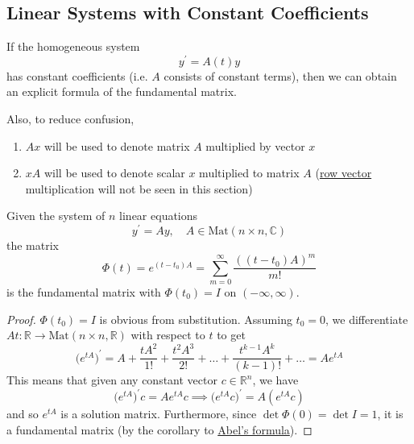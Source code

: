 \documentclass{article}
\newcounter{theorem}[section]
\begin{document}
  \subsection{Linear Systems with Constant Coefficients}

    If the homogeneous system 
    \begin{equation}
      y^\prime = A(t) y
    \end{equation}
    has constant coefficients (i.e. $A$ consists of constant terms), then we can obtain an explicit formula of the fundamental matrix. 

    Also, to reduce confusion, 
    \begin{enumerate}
        \item $Ax$ will be used to denote matrix $A$ multiplied by vector $x$
        \item $xA$ will be used to denote scalar $x$ multiplied to matrix $A$ (\hyperref[lin-def:row-vector]{row vector} multiplication will not be seen in this section)
    \end{enumerate}

    \begin{theorem}
      \label{thm:fundamental-matrix-of-a-linear-system-with}
    Given the system of $n$ linear equations 
    \begin{equation}
      y^\prime = A y, \quad A \in \text{Mat}(n \times n, \mathbb{C})
    \end{equation}
    the matrix
    \begin{equation}
      \Phi(t) = e^{(t-t_0)A} = \sum_{m=0}^\infty \frac{((t-t_0)A)^m}{m!}
    \end{equation}
    is the fundamental matrix with $\Phi(t_0) = I$ on $(-\infty, \infty)$. 
    \end{theorem}
    \begin{proof}
    $\Phi(t_0) = I$ is obvious from substitution. Assuming $t_0 = 0$, we differentiate $At: \mathbb{R} \to \text{Mat}(n \times n, \mathbb{R})$ with respect to $t$ to get
    \begin{equation}
      \big( e^{tA} \big)^\prime = A + \frac{tA^2} {1!} + \frac{t^2 A^3}{2!} + \ldots + \frac{t^{k-1} A^{k}}{(k-1)!} + \ldots = A e^{tA}
    \end{equation}
    This means that given any constant vector $c \in \mathbb{R}^n$, we have
    \begin{equation}
      \big( e^{tA} \big)^\prime c = A e^{tA} c \implies \big( e^{tA} c\big)^\prime = A (e^{tA} c)
    \end{equation}
    and so $e^{tA}$ is a solution matrix. Furthermore, since $\det{ \Phi(0)} = \det{I} = 1$, it is a fundamental matrix (by the corollary to \hyperref[thm:abels-formula]{Abel's formula}). 
    \end{proof}
\end{document}

